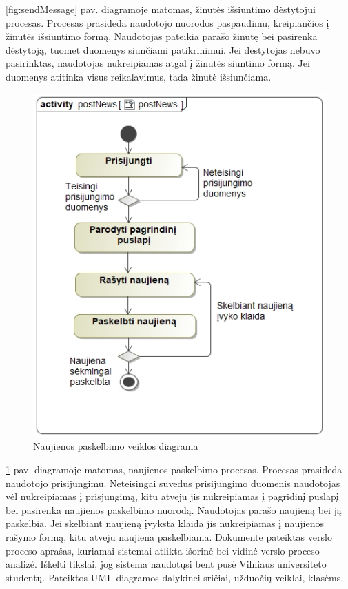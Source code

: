 \documentclass{VUMIFPSkursinis}
\begin{document}
	\ref{fig:sendMessage} pav. diagramoje matomas, žinutės išsiuntimo dėstytojui procesas. Procesas prasideda naudotojo
	nuorodos paspaudimu, kreipiančios į žinutės išsiuntimo formą. Naudotojas pateikia parašo žinutę bei pasirenka dėstytoją, tuomet duomenys siunčiami patikrinimui. Jei dėstytojas nebuvo pasirinktas, naudotojas nukreipiamas
	atgal į žinutės siuntimo formą. Jei duomenys atitinka visus reikalavimus, tada žinutė išsiunčiama.
	\begin{figure}[H]
		\centering
		\includegraphics[scale=0.65]{img/postNews.jpg}
		\caption{Naujienos paskelbimo veiklos diagrama}
		\label{fig:postNews}
	\end{figure}
	\ref{fig:postNews} pav. diagramoje matomas, naujienos paskelbimo procesas. Procesas prasideda naudotojo prisijungimu. Neteisingai suvedus prisijungimo duomenis naudotojas vėl nukreipiamas į prisjungimą, kitu atveju jis nukreipiamas į pagridinį puslapį bei pasirenka naujienos paskelbimo nuorodą. Naudotojas parašo naujieną bei ją paskelbia. Jei skelbiant naujieną įvyksta klaida jis nukreipiamas į naujienos rašymo formą, kitu atveju naujiena paskelbiama.
	\newpage
{}
Dokumente pateiktas verslo proceso aprašas, kuriamai sistemai atlikta išorinė bei vidinė verslo proceso analizė. Iškelti tikslai, jog sistema naudotųsi bent pusė Vilniaus universiteto studentų. Pateiktos UML diagramos dalykinei sričiai, užduočių veiklai, klasėms.
\end{document}
